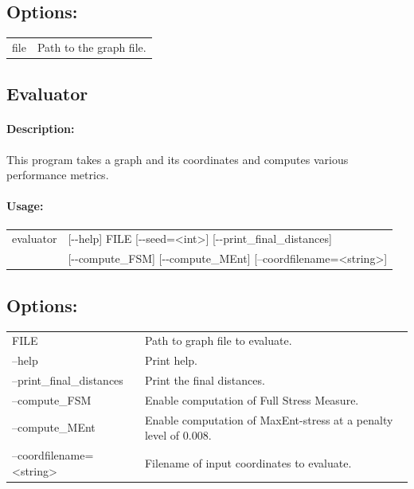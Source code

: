 \documentclass[11pt]{article}
\begin{document}
\subsection*{Options:\\} 
\begin{tabularx}{\textwidth}{lX}
  file                       & Path to the graph file. \\
\end{tabularx}

\vfill
\pagebreak
\subsection{Evaluator}
\paragraph*{Description:} This program takes a graph and its coordinates and computes various performance metrics.
\paragraph*{Usage:\\} 

\begin{tabular}{ll}
evaluator &   [-{}-help] FILE [-{}-seed=<int>] [-{}-print\_final\_distances]  \\
& [-{}-compute\_FSM] [-{}-compute\_MEnt] [--coordfilename=<string>]

\end{tabular}
                          
\subsection*{Options:\\}

\begin{tabularx}{\textwidth}{lX}
  FILE                          & Path to graph file to evaluate.\\
  --help                        & Print help. \\
  --print\_final\_distances     & Print the final distances. \\
  --compute\_FSM                & Enable computation of Full Stress Measure.\\
  --compute\_MEnt               & Enable computation of MaxEnt-stress at a penalty level of 0.008.\\
  --coordfilename=<string>      & Filename of input coordinates to evaluate. \\
\end{tabularx}
\end{document}
